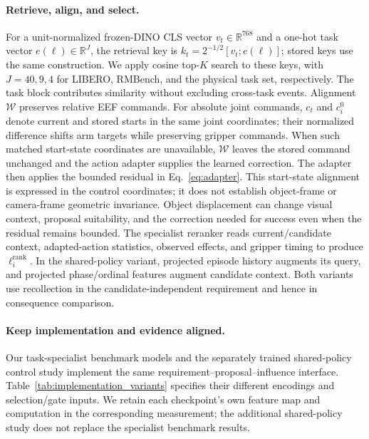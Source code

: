 \paragraph{Retrieve, align, and select.}
For a unit-normalized frozen-DINO CLS vector $v_t\in\mathbb R^{768}$ and a one-hot task vector $e(\ell)\in\mathbb R^J$, the retrieval key is $k_t=2^{-1/2}[v_t;e(\ell)]$; stored keys use the same construction.
We apply cosine top-$K$ search to these keys, with $J=40,9,4$ for LIBERO, RMBench, and the physical task set, respectively.
The task block contributes similarity without excluding cross-task events.
Alignment $\mathcal W$ preserves relative EEF commands. For absolute joint commands, $c_t$ and $c_i^0$ denote current and stored starts in the same joint coordinates; their normalized difference shifts arm targets while preserving gripper commands.
When such matched start-state coordinates are unavailable, $\mathcal W$ leaves the stored command unchanged and the action adapter supplies the learned correction.
The adapter then applies the bounded residual in Eq.~\eqref{eq:adapter}.
This start-state alignment is expressed in the control coordinates; it does not establish object-frame or camera-frame geometric invariance.
Object displacement can change visual context, proposal suitability, and the correction needed for success even when the residual remains bounded.
The specialist reranker reads current/candidate context, adapted-action statistics, observed effects, and gripper timing to produce $\ell_i^{\mathrm{rank}}$.
In the shared-policy variant, projected episode history augments its query, and projected phase/ordinal features augment candidate context.
Both variants use recollection in the candidate-independent requirement and hence in consequence comparison.

\paragraph{Keep implementation and evidence aligned.}
\label{app:implementation_variants}
Our task-specialist benchmark models and the separately trained shared-policy control study implement the same requirement--proposal--influence interface.
Table~\ref{tab:implementation_variants} specifies their different encodings and selection/gate inputs.
We retain each checkpoint's own feature map and computation in the corresponding measurement; the additional shared-policy study does not replace the specialist benchmark results.

